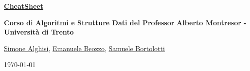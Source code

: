 \documentclass[12pt, a4paper]{book}
\begin{document}
\frontmatter
	\begin{titlepage}
		\begin{center}
		{\Huge \href{https://github.com/emanuelebeozzo/CheatSheetAlgoritmi}{\textbf{CheatSheet}} \par}
    		\vspace{0.5cm}
    		{\Large \textbf{Corso di Algoritmi e Strutture Dati del Professor}
    		\vspace{0.2cm}
    		\textbf{Alberto Montresor - Università di Trento} \par}
		\vspace*{\fill}
    		{\Large 
    		\faGithub \hspace{0.2em} \href{https://github.com/Simone-Alghisi}{Simone Alghisi},	
    		\faGithub \hspace{0.2em} \href{https://github.com/emanuelebeozzo}{Emanuele Beozzo}, 
    		\faGithub \hspace{0.2em} \href{https://github.com/samuelebortolotti}{Samuele Bortolotti}
    		\par}
    		\vspace{0.5cm}
    		{\today}
		\end{center}
	\end{titlepage}
	\tableofcontents
	\lstlistoflistings
	\mainmatter
	
	
	
	
	
	
	
	
	
	
	
	
	
	
	
	
	
	
	
\end{document}
